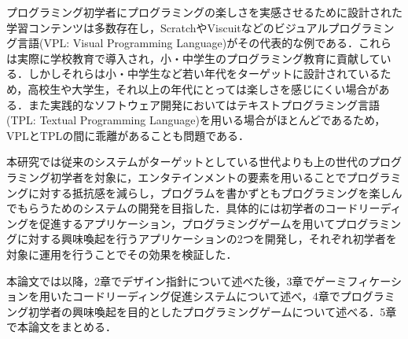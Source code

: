 プログラミング初学者にプログラミングの楽しさを実感させるために設計された学習コンテンツは多数存在し，ScratchやViscuitなどのビジュアルプログラミング言語(VPL: Visual Programming Language)がその代表的な例である．これらは実際に学校教育で導入され，小・中学生のプログラミング教育に貢献している．しかしそれらは小・中学生など若い年代をターゲットに設計されているため，高校生や大学生，それ以上の年代にとっては楽しさを感じにくい場合がある．また実践的なソフトウェア開発においてはテキストプログラミング言語(TPL: Textual Programming Language)を用いる場合がほとんどであるため，VPLとTPLの間に乖離があることも問題である．

本研究では従来のシステムがターゲットとしている世代よりも上の世代のプログラミング初学者を対象に，エンタテインメントの要素を用いることでプログラミングに対する抵抗感を減らし，プログラムを書かずともプログラミングを楽しんでもらうためのシステムの開発を目指した．具体的には初学者のコードリーディングを促進するアプリケーション，プログラミングゲームを用いてプログラミングに対する興味喚起を行うアプリケーションの2つを開発し，それぞれ初学者を対象に運用を行うことでその効果を検証した．


本論文では以降，2章でデザイン指針について述べた後，3章でゲーミフィケーションを用いたコードリーディング促進システムについて述べ，4章でプログラミング初学者の興味喚起を目的としたプログラミングゲームについて述べる．5章で本論文をまとめる．